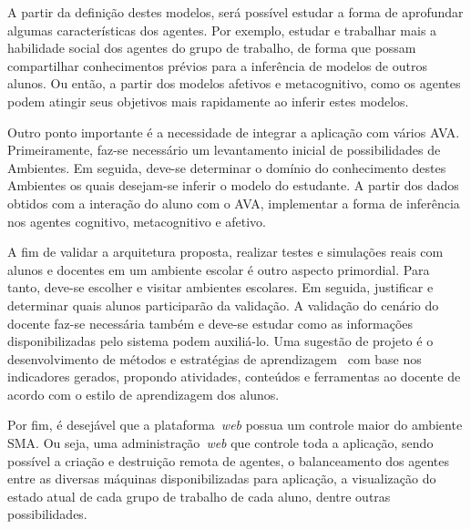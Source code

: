 A partir da definição destes modelos, será possível estudar a forma de aprofundar algumas características dos agentes. Por exemplo, estudar e trabalhar mais a habilidade social dos agentes do grupo de trabalho, de forma que possam compartilhar conhecimentos prévios para a inferência de modelos de outros alunos. Ou então, a partir dos modelos afetivos e metacognitivo, como os agentes podem atingir seus objetivos mais rapidamente ao inferir estes modelos.

Outro ponto importante é a necessidade de integrar a aplicação com vários AVA. Primeiramente, faz-se necessário um levantamento inicial de possibilidades de Ambientes. Em seguida, deve-se determinar o domínio do conhecimento destes Ambientes os quais desejam-se inferir o modelo do estudante. A partir dos dados obtidos com a interação do aluno com o AVA, implementar a forma de inferência nos agentes cognitivo, metacognitivo e afetivo.

A fim de validar a arquitetura proposta, realizar testes e simulações reais com alunos e docentes em um ambiente escolar é outro aspecto primordial. Para tanto, deve-se escolher e visitar ambientes escolares. Em seguida, justificar e determinar quais alunos participarão da validação. A validação do cenário do docente faz-se necessária também e deve-se estudar como as informações disponibilizadas pelo sistema podem auxiliá-lo. Uma sugestão de projeto é o desenvolvimento de métodos e estratégias de aprendizagem~\cite{muhlbeier12} com base nos indicadores gerados, propondo atividades, conteúdos e ferramentas ao docente de acordo com o estilo de aprendizagem dos alunos.

Por fim, é desejável que a plataforma~\emph{web} possua um controle maior do ambiente SMA. Ou seja, uma administração~\emph{web} que controle toda a aplicação, sendo possível a criação e destruição remota de agentes, o balanceamento dos agentes entre as diversas máquinas disponibilizadas para aplicação, a visualização do estado atual de cada grupo de trabalho de cada aluno, dentre outras possibilidades.
